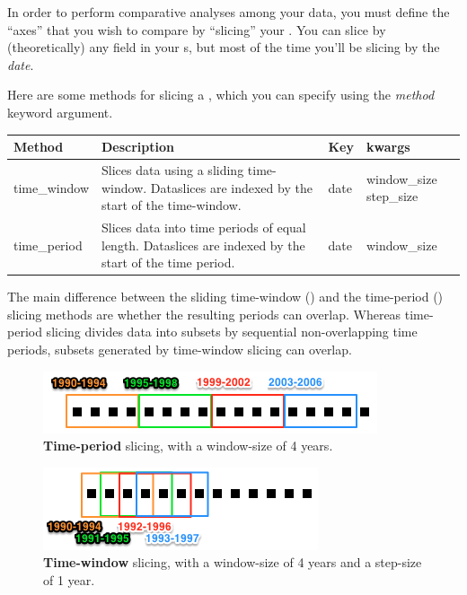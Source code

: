 \documentclass[letterpaper,10pt,english]{sphinxmanual}
\begin{document}
\begin{fulllineitems}
\begin{fulllineitems}
In order to perform comparative analyses among your data, you must
define the ``axes'' that you wish to compare by ``slicing'' your
{\hyperref[tethne.classes.corpus:tethne.classes.corpus.Corpus]{}}. You can slice by (theoretically) any field in your
{\hyperref[tethne.classes.paper:tethne.classes.paper.Paper]{}}s, but most of the time you'll be slicing by the \emph{date}.

Here are some methods for slicing a {\hyperref[tethne.classes.corpus:tethne.classes.corpus.Corpus]{}}, which you can
specify using the \emph{method} keyword argument.

\begin{tabulary}{\linewidth}{|L|L|L|L|}
\hline
\textsf{\relax 
Method
} & \textsf{\relax 
Description
} & \textsf{\relax 
Key
} & \textsf{\relax 
kwargs
}\\
\hline
time\_window
 & 
Slices data using a sliding
time-window. Dataslices are
indexed by the start of the
time-window.
 & 
date
 & 
window\_size
step\_size
\\

time\_period
 & 
Slices data into time periods
of equal length. Dataslices
are indexed by the start of
the time period.
 & 
date
 & 
window\_size
\\
\hline\end{tabulary}


The main difference between the sliding time-window ()
and the time-period () slicing methods are whether the
resulting periods can overlap. Whereas time-period slicing divides data
into subsets by sequential non-overlapping time periods, subsets
generated by time-window slicing can overlap.
\begin{figure}[htbp]
\centering
\capstart

\includegraphics{timeline.timeslice.png}
\caption{\textbf{Time-period} slicing, with a window-size of 4 years.}\end{figure}
\begin{figure}[htbp]
\centering
\capstart

\includegraphics{timeline.timewindow.png}
\caption{\textbf{Time-window} slicing, with a window-size of 4 years and a
step-size of 1 year.}\end{figure}


\end{fulllineitems}
\end{fulllineitems}
\end{document}
